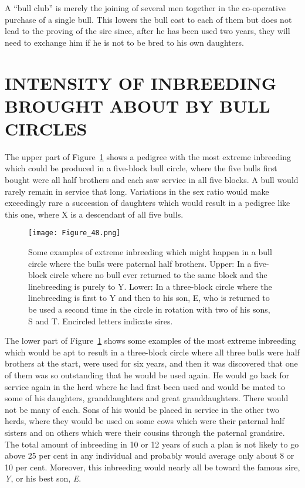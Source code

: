 A ``bull club'' is merely the joining of several men together in the
co-operative purchase of a single bull. This lowers the bull cost to each
of them but does not lead to the proving of the sire since, after he has
been used two years, they will need to exchange him if he is not to be
bred to his own daughters.

\section*{INTENSITY OF INBREEDING BROUGHT ABOUT BY BULL CIRCLES}

The upper part of Figure~\ref{fig:Lush_Figure_48} shows a pedigree with the most extreme
inbreeding which could be produced in a five-block bull circle, where
the five bulls first bought were all half brothers and each saw service in
all five blocks. A bull would rarely remain in service that long. Variations
in the sex ratio would make exceedingly rare a succession of
daughters which would result in a pedigree like this one, where X is a
descendant of all five bulls.

\begin{figure}
	\centering
    \texttt{[image: Figure\_48.png]}
    \caption{Some examples of extreme inbreeding which might happen in a bull
			 circle where the bulls were paternal half brothers. Upper: In a
			 five-block circle where no bull ever returned to the same block
			 and the linebreeding is purely to Y. Lower: In a three-block circle
			 where the linebreeding is first to Y and then to his son, E, who
			 is returned to be used a second time in the circle in rotation
			 with two of his sons, S and T. Encircled letters indicate sires.}
    \label{fig:Lush_Figure_48}
\end{figure}

The lower part of Figure~\ref{fig:Lush_Figure_48} shows some examples of the most
extreme inbreeding which would be apt to result in a three-block circle
where all three bulls were half brothers at the start, were used for six
years, and then it was discovered that one of them was so outstanding
that he would be used again. He would go back for service again in the
herd where he had first been used and would be mated to some of his
daughters, granddaughters and great granddaughters. There would not
be many of each. Sons of his would be placed in service in the other two
herds, where they would be used on some cows which were their paternal
half sisters and on others which were their cousins through the
paternal grandsire. The total amount of inbreeding in 10 or 12 years of
such a plan is not likely to go above 25 per cent in any individual and
probably would average only about 8 or 10 per cent. Moreover, this
inbreeding would nearly all be toward the famous sire, \textit{Y}, or his best
son, \textit{E}.

